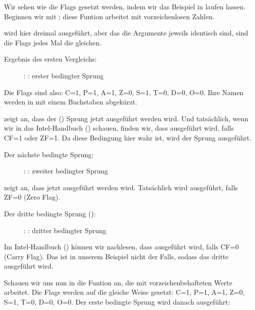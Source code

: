 \clearpage
{}
\myindex{\olly}
Wir sehen wie die Flags gesetzt werden, indem wir das Beispiel in \olly laufen lassen.
Beginnen wir mit ; diese Funtion arbeitet mit vorzeichenlosen Zahlen.

\CMP wird hier dreimal ausgeführt, aber das die Argumente jeweils identisch sind, sind die Flags jedes Mal die gleichen.

Ergebnis des ersten Vergleichs:

\begin{figure}[H]
\centering
{}
\caption{\olly: : erster bedingter Sprung}
\label{fig:jcc_olly_unsigned_1}
\end{figure}

Die Flags sind also: C=1, P=1, A=1, Z=0, S=1, T=0, D=0, O=0.
Ihre Namen werden in \olly mit einem Buchstaben abgekürzt.

\olly zeigt an, dass der (\JBE) Sprung jetzt ausgeführt werden wird.
Und tatsächlich, wenn wir in das Intel-Handbuch () schauen, finden wir, dass \JBE ausgeführt wird,
falls CF=1 oder ZF=1.
Da diese Bedingung hier wahr ist, wird der Sprung ausgeführt.


\clearpage
Der nächste bedingte Sprung:

\begin{figure}[H]
\centering
{}
\caption{\olly: : zweiter bedingter Sprung}
\label{fig:jcc_olly_unsigned_2}
\end{figure}

\olly zeigt an, dass \JNZ jetzt ausgeführt werden wird.
Tatsächlich wird \JNZ ausgeführt, falls ZF=0 (Zero Flag).

\clearpage
Der dritte bedingte Sprung (\JNB):

\begin{figure}[H]
\centering
{}
\caption{\olly: : dritter bedingter Sprung}
\label{fig:jcc_olly_unsigned_3}
\end{figure}
Im Intel-Handbuch () können wir nachlesen, dass \JNB ausgeführt wird, falls CF=0 (Carry Flag).
Das ist in unserem Beispiel nicht der Falls, sodass das dritte \printf ausgeführt wird.

\clearpage
Schauen wir uns nun in \olly die  Funtion an, die mit vorzeichenbehafteten Werte arbeitet.
Die Flags werden auf die gleiche Weise gesetzt: C=1, P=1, A=1, Z=0, S=1, T=0, D=0, O=0.
Der erste bedingte Sprung \JLE wird danach ausgeführt:

